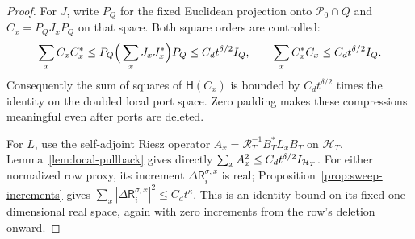 \begin{proof}
For \(J\), write \(P_Q\) for the fixed Euclidean projection onto
\(\mathcal P_0\cap Q\) and \(C_x=P_QJ_xP_Q\) on that space.
Both square orders are controlled:
\[
 \sum_x C_xC_x^*\le P_Q\Big(\sum_xJ_xJ_x^*\Big)P_Q
       \le C_dt^{\delta/2}I_Q,\qquad
 \sum_x C_x^*C_x\le C_dt^{\delta/2}I_Q.
\]
Consequently the sum of squares of \(\mathsf H(C_x)\) is bounded
by \(C_dt^{\delta/2}\) times the identity on the doubled local
port space.  Zero padding makes these compressions meaningful even
after ports are deleted.

For \(L\), use the self-adjoint Riesz operator
\(A_x=\mathcal R_T^{-1}B_T^*L_xB_T\) on \(\mathcal H_T\).
Lemma~\ref{lem:local-pullback} gives directly
\(\sum_x A_x^2\le C_dt^{\delta/2}I_{\mathcal H_T}\).
For either normalized row proxy, its increment \(\Delta\mathsf R_i^{\sigma,x}\)
is real; Proposition~\ref{prop:sweep-increments} gives
\(\sum_x|\Delta\mathsf R_i^{\sigma,x}|^2\le C_dt^\kappa\).  This is an identity
bound on its fixed one-dimensional real space, again with zero
increments from the row's deletion onward.


\end{proof}
